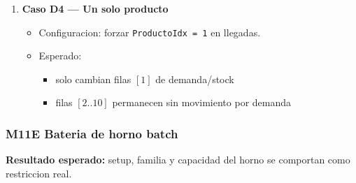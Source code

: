 \documentclass[11pt]{article}
\newcommand{\state}[1]{\texttt{#1}}
\begin{document}
\begin{enumerate}
\begin{itemize}
  \end{itemize}
  \item \textbf{Caso D4 --- Un solo producto}
  \begin{itemize}
    \item Configuracion: forzar \state{ProductoIdx = 1} en llegadas.
    \item Esperado:
    \begin{itemize}
      \item solo cambian filas \([1]\) de demanda/stock
      \item filas \([2..10]\) permanecen sin movimiento por demanda
    \end{itemize}
  \end{itemize}
\end{enumerate}

\subsubsection{M11E Bateria de horno batch}
\textbf{Resultado esperado:} setup, familia y capacidad del horno se comportan como restriccion real.
\end{document}

